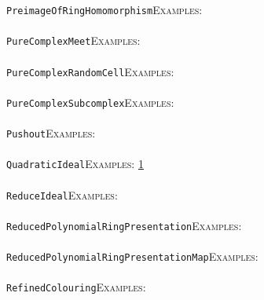 \documentclass[a4paper,11pt]{report}
\begin{document}
{{ \texttt{PreimageOfRingHomomorphism}{\nobreakspace}{\nobreakspace}{\nobreakspace}{\nobreakspace}\textsc{Examples:} \\
 \\
 \texttt{PureComplexMeet}{\nobreakspace}{\nobreakspace}{\nobreakspace}{\nobreakspace}\textsc{Examples:} \\
 \\
 \texttt{PureComplexRandomCell}{\nobreakspace}{\nobreakspace}{\nobreakspace}{\nobreakspace}\textsc{Examples:} \\
 \\
 \texttt{PureComplexSubcomplex}{\nobreakspace}{\nobreakspace}{\nobreakspace}{\nobreakspace}\textsc{Examples:} \\
 \\
 \texttt{Pushout}{\nobreakspace}{\nobreakspace}{\nobreakspace}{\nobreakspace}\textsc{Examples:} \\
 \\
 \texttt{QuadraticIdeal}{\nobreakspace}{\nobreakspace}{\nobreakspace}{\nobreakspace}\textsc{Examples:} \href{tutorial/chap10.html} {1}{\nobreakspace} \\
 \\
 \texttt{ReduceIdeal}{\nobreakspace}{\nobreakspace}{\nobreakspace}{\nobreakspace}\textsc{Examples:} \\
 \\
 \texttt{ReducedPolynomialRingPresentation}{\nobreakspace}{\nobreakspace}{\nobreakspace}{\nobreakspace}\textsc{Examples:} \\
 \\
 \texttt{ReducedPolynomialRingPresentationMap}{\nobreakspace}{\nobreakspace}{\nobreakspace}{\nobreakspace}\textsc{Examples:} \\
 \\
 \texttt{RefinedColouring}{\nobreakspace}{\nobreakspace}{\nobreakspace}{\nobreakspace}\textsc{Examples:} \\
 \\
}}
\end{document}
